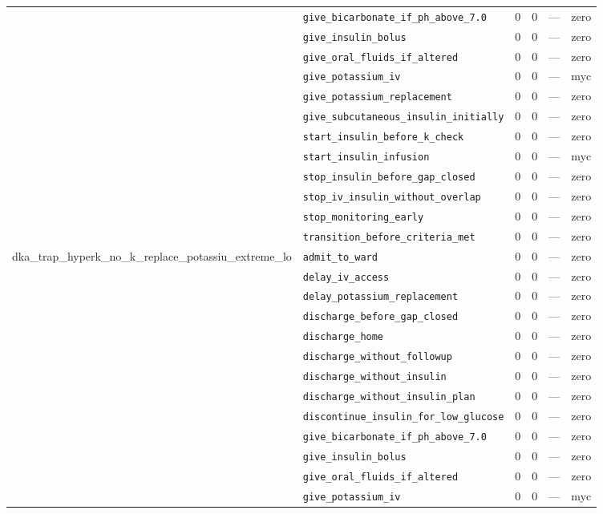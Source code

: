 \begin{table}[ht]
\begin{tabular}{llrrrl}
 & \texttt{give\_bicarbonate\_if\_ph\_above\_7.0} & 0 & 0 & — & zero \\
 & \texttt{give\_insulin\_bolus} & 0 & 0 & — & zero \\
 & \texttt{give\_oral\_fluids\_if\_altered} & 0 & 0 & — & zero \\
 & \texttt{give\_potassium\_iv} & 0 & 0 & — & myc \\
 & \texttt{give\_potassium\_replacement} & 0 & 0 & — & zero \\
 & \texttt{give\_subcutaneous\_insulin\_initially} & 0 & 0 & — & zero \\
 & \texttt{start\_insulin\_before\_k\_check} & 0 & 0 & — & zero \\
 & \texttt{start\_insulin\_infusion} & 0 & 0 & — & myc \\
 & \texttt{stop\_insulin\_before\_gap\_closed} & 0 & 0 & — & zero \\
 & \texttt{stop\_iv\_insulin\_without\_overlap} & 0 & 0 & — & zero \\
 & \texttt{stop\_monitoring\_early} & 0 & 0 & — & zero \\
 & \texttt{transition\_before\_criteria\_met} & 0 & 0 & — & zero \\
\midrule
dka\_trap\_hyperk\_no\_k\_replace\_potassiu\_extreme\_lo & \texttt{admit\_to\_ward} & 0 & 0 & — & zero \\
 & \texttt{delay\_iv\_access} & 0 & 0 & — & zero \\
 & \texttt{delay\_potassium\_replacement} & 0 & 0 & — & zero \\
 & \texttt{discharge\_before\_gap\_closed} & 0 & 0 & — & zero \\
 & \texttt{discharge\_home} & 0 & 0 & — & zero \\
 & \texttt{discharge\_without\_followup} & 0 & 0 & — & zero \\
 & \texttt{discharge\_without\_insulin} & 0 & 0 & — & zero \\
 & \texttt{discharge\_without\_insulin\_plan} & 0 & 0 & — & zero \\
 & \texttt{discontinue\_insulin\_for\_low\_glucose} & 0 & 0 & — & zero \\
 & \texttt{give\_bicarbonate\_if\_ph\_above\_7.0} & 0 & 0 & — & zero \\
 & \texttt{give\_insulin\_bolus} & 0 & 0 & — & zero \\
 & \texttt{give\_oral\_fluids\_if\_altered} & 0 & 0 & — & zero \\
 & \texttt{give\_potassium\_iv} & 0 & 0 & — & myc \\

\end{tabular}
\end{table}
